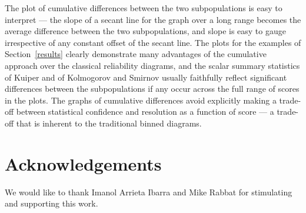 \documentclass{article}
\begin{document}
The plot of cumulative differences between the two subpopulations
is easy to interpret --- the slope of a secant line for the graph over
a long range becomes the average difference between the two subpopulations,
and slope is easy to gauge irrespective of any constant offset
of the secant line. The plots for the examples of Section~\ref{results}
clearly demonstrate many advantages of the cumulative approach
over the classical reliability diagrams, and the scalar summary statistics
of Kuiper and of Kolmogorov and Smirnov usually faithfully reflect
significant differences between the subpopulations if any occur
across the full range of scores in the plots.
The graphs of cumulative differences avoid explicitly making
a trade-off between statistical confidence and resolution as a function
of score --- a trade-off that is inherent to the traditional binned diagrams.



\section*{Acknowledgements}

We would like to thank Imanol Arrieta Ibarra and Mike Rabbat
for stimulating and supporting this work.



\newpage





\end{document}
